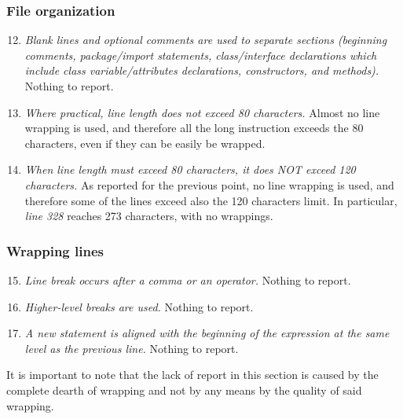 	\subsubsection{File organization}
		\begin{enumerate}
			\setcounter{enumi}{11}
			\item \textit{Blank lines and optional comments are used to separate sections (beginning comments, package/import statements, class/interface declarations which include class variable/attributes declarations, constructors, and methods).}\newline
			Nothing to report. %

			\item \textit{Where practical, line length does not exceed 80 characters.}\newline
			Almost no line wrapping is used, and therefore all the long instruction exceeds the 80 characters, even if they can be easily be wrapped.

			\item \textit{When line length must exceed 80 characters, it does NOT exceed 120 characters.}\newline
			As reported for the previous point, no line wrapping is used, and therefore some of the lines exceed also the 120 characters limit. In particular, \textit{line 328} reaches 273 characters, with no wrappings.  
		\end{enumerate}

	\subsubsection{Wrapping lines}
		\begin{enumerate}
			\setcounter{enumi}{14}
			\item \textit{Line break occurs after a comma or an operator.}\newline
			Nothing to report. %

			\item \textit{Higher-level breaks are used.}\newline
			Nothing to report. %

			\item \textit{A new statement is aligned with the beginning of the expression at the same level as the previous line.}\newline
			Nothing to report. %
		\end{enumerate}
	It is important to note that the lack of report in this section is caused by the complete dearth of wrapping and not by any means by the quality of said wrapping. 

